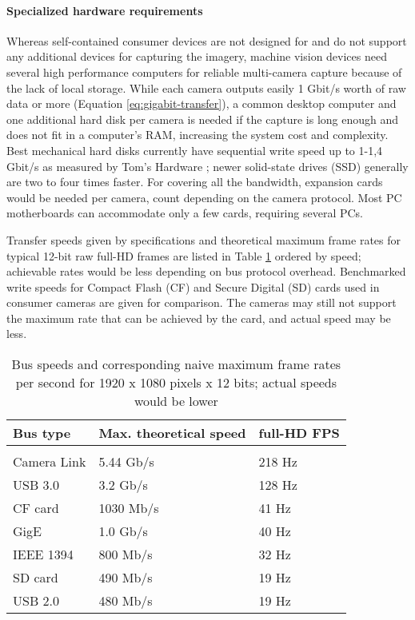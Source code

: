 \paragraph{Specialized hardware requirements}
Whereas self-contained consumer devices are not designed for and do not support any additional devices for capturing the imagery, machine vision devices need several high performance computers for reliable multi-camera capture because of the lack of local storage.
While each camera outputs easily 1 Gbit/s worth of raw data or more (Equation \ref{eq:gigabit-transfer}), a common desktop computer and one additional hard disk per camera is needed if the capture is long enough and does not fit in a computer's RAM, increasing the system cost and complexity.
Best mechanical hard disks currently have sequential write speed up to 1-1,4 Gbit/s as measured by Tom's Hardware \cite{tomshw-hddwrite};
newer solid-state drives (SSD) generally are two to four times faster. \cite{tomshw-ssdwrite}
For covering all the bandwidth, expansion cards would be needed per camera, count depending on the camera protocol.
Most PC motherboards can accommodate only a few cards, requiring several PCs.

Transfer speeds given by specifications and theoretical maximum frame rates for typical 12-bit raw full-HD frames are listed in Table \ref{tab:busspeeds} ordered by speed; achievable rates would be less depending on bus protocol overhead.
\cite{hornberg2007handbook,ni2013choosing}
Benchmarked \cite{tomshw-sdwrite,tomshw-cfwrite} write speeds for Compact Flash (CF) and Secure Digital (SD) cards used in consumer cameras are given for comparison.
The cameras may still not support the maximum rate that can be achieved by the card, and actual speed may be less.

\begin{table}[h]
	\centering
	\begin{tabular}{l l l}
		Bus type & Max. theoretical speed & full-HD FPS\\
		\hline \\
		Camera Link & 5.44 Gb/s & 218 Hz\\
		USB 3.0 & 3.2 Gb/s & 128 Hz\\
		CF card \cite{tomshw-cfwrite} & 1030 Mb/s & 41 Hz\\
		GigE & 1.0 Gb/s & 40 Hz\\
		IEEE 1394 & 800 Mb/s & 32 Hz\\
		SD card \cite{tomshw-sdwrite} & 490 Mb/s & 19 Hz\\
		USB 2.0 & 480 Mb/s & 19 Hz\\
	\end{tabular}
	\caption{Bus speeds and corresponding naive maximum frame rates per second for 1920 x 1080 pixels x 12 bits; actual speeds would be lower}
	\label{tab:busspeeds}
\end{table}

